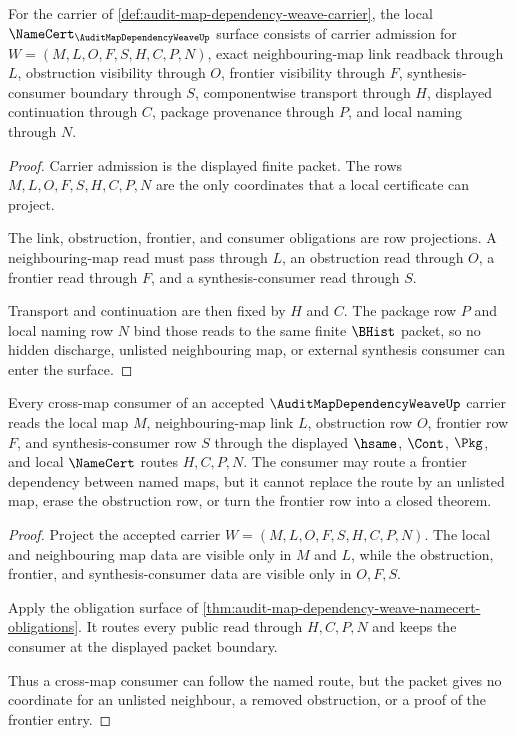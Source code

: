\begin{theorem}
\label{thm:audit-map-dependency-weave-namecert-obligations}
For the carrier of \autoref{def:audit-map-dependency-weave-carrier}, the local $\NameCert_{\AuditMapDependencyWeaveUp}$ surface consists of carrier admission for $W=(M,L,O,F,S,H,C,P,N)$, exact neighbouring-map link readback through $L$, obstruction visibility through $O$, frontier visibility through $F$, synthesis-consumer boundary through $S$, componentwise transport through $H$, displayed continuation through $C$, package provenance through $P$, and local naming through $N$.
\end{theorem}
\begin{proof}
Carrier admission is the displayed finite packet. The rows $M,L,O,F,S,H,C,P,N$ are the only coordinates that a local certificate can project.

The link, obstruction, frontier, and consumer obligations are row projections. A neighbouring-map read must pass through $L$, an obstruction read through $O$, a frontier read through $F$, and a synthesis-consumer read through $S$.

Transport and continuation are then fixed by $H$ and $C$. The package row $P$ and local naming row $N$ bind those reads to the same finite $\BHist$ packet, so no hidden discharge, unlisted neighbouring map, or external synthesis consumer can enter the surface.
\end{proof}

\begin{theorem}
\label{thm:audit-map-dependency-weave-cross-map-consumer-boundary}
Every cross-map consumer of an accepted $\AuditMapDependencyWeaveUp$ carrier reads the local map $M$, neighbouring-map link $L$, obstruction row $O$, frontier row $F$, and synthesis-consumer row $S$ through the displayed $\hsame$, $\Cont$, $\Pkg$, and local $\NameCert$ routes $H,C,P,N$. The consumer may route a frontier dependency between named maps, but it cannot replace the route by an unlisted map, erase the obstruction row, or turn the frontier row into a closed theorem.
\end{theorem}
\begin{proof}
Project the accepted carrier $W=(M,L,O,F,S,H,C,P,N)$. The local and neighbouring map data are visible only in $M$ and $L$, while the obstruction, frontier, and synthesis-consumer data are visible only in $O,F,S$.

Apply the obligation surface of \autoref{thm:audit-map-dependency-weave-namecert-obligations}. It routes every public read through $H,C,P,N$ and keeps the consumer at the displayed packet boundary.

Thus a cross-map consumer can follow the named route, but the packet gives no coordinate for an unlisted neighbour, a removed obstruction, or a proof of the frontier entry.
\end{proof}

